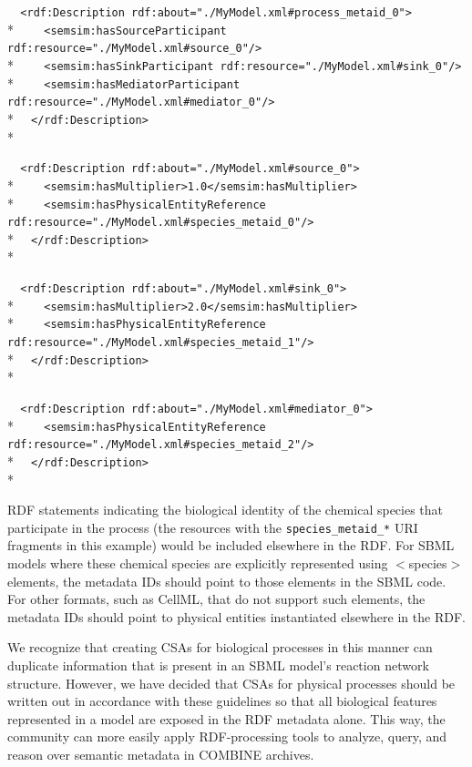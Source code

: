 \documentclass[pdftex,rgb,dvipsnames,svgnames,hyperref,table]{report}
\begin{document}
\verb|  <rdf:Description rdf:about="./MyModel.xml#process_metaid_0">|\\*
\verb|    <semsim:hasSourceParticipant rdf:resource="./MyModel.xml#source_0"/>|\\*
\verb|    <semsim:hasSinkParticipant rdf:resource="./MyModel.xml#sink_0"/>|\\*
\verb|    <semsim:hasMediatorParticipant rdf:resource="./MyModel.xml#mediator_0"/>|\\*
\verb|  </rdf:Description>|\\*


\verb|  <rdf:Description rdf:about="./MyModel.xml#source_0">|\\*
\verb|    <semsim:hasMultiplier>1.0</semsim:hasMultiplier>|\\*
\verb|    <semsim:hasPhysicalEntityReference rdf:resource="./MyModel.xml#species_metaid_0"/>|\\*
\verb|  </rdf:Description>|\\*


\verb|  <rdf:Description rdf:about="./MyModel.xml#sink_0">|\\*
\verb|    <semsim:hasMultiplier>2.0</semsim:hasMultiplier>|\\*
\verb|    <semsim:hasPhysicalEntityReference rdf:resource="./MyModel.xml#species_metaid_1"/>|\\*
\verb|  </rdf:Description>|\\*
  
  
\verb|  <rdf:Description rdf:about="./MyModel.xml#mediator_0">|\\*
\verb|    <semsim:hasPhysicalEntityReference rdf:resource="./MyModel.xml#species_metaid_2"/>|\\*
\verb|  </rdf:Description>|\\*
  
RDF statements indicating the biological identity of the chemical species that participate in the process (the resources with the \texttt{species\_metaid\_*} URI fragments in this example) would be included elsewhere in the RDF. For SBML models where these chemical species are explicitly represented using $<$species$>$ elements, the metadata IDs should point to those elements in the SBML code. For other formats, such as CellML, that do not support such elements, the metadata IDs should point to physical entities instantiated elsewhere in the RDF.

We recognize that creating CSAs for biological processes in this manner can duplicate information that is present in an SBML model's reaction network structure. However, we have decided that CSAs for physical processes should be written out in accordance with these guidelines so that all biological features represented in a model are exposed in the RDF metadata alone. This way, the community can more easily apply RDF-processing tools to analyze, query, and reason over semantic metadata in COMBINE archives.  
  
\end{document}
